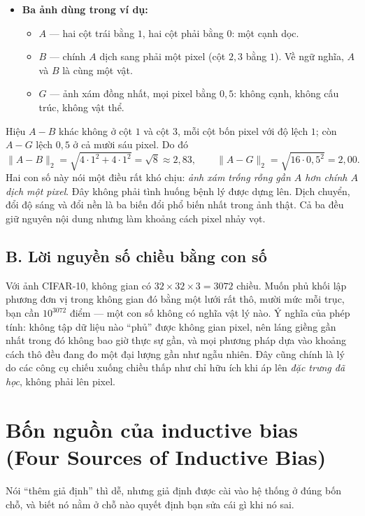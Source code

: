 \documentclass[../../deep_learning.tex]{subfiles}
\begin{document}
\begin{itemize}
\item \textbf{Ba ảnh dùng trong ví dụ:}
  \begin{itemize}
  \item \(A\) --- hai cột trái bằng \(1\), hai cột phải bằng \(0\): một cạnh dọc.
  \item \(B\) --- chính \(A\) dịch sang phải một pixel (cột \(2,3\) bằng \(1\)). Về ngữ nghĩa, \(A\) và \(B\) là cùng một vật.
  \item \(G\) --- ảnh xám đồng nhất, mọi pixel bằng \(0{,}5\): không cạnh, không cấu trúc, không vật thể.
  \end{itemize}
\end{itemize}

Hiệu \(A-B\) khác không ở cột \(1\) và cột \(3\), mỗi cột bốn pixel với độ lệch \(1\); còn \(A-G\) lệch \(0{,}5\) ở cả mười sáu pixel. Do đó
\[
\|A-B\|_2 = \sqrt{4\cdot 1^2 + 4\cdot 1^2} = \sqrt{8} \approx 2{,}83,
\qquad
\|A-G\|_2 = \sqrt{16\cdot 0{,}5^2} = 2{,}00 .
\]
Hai con số này nói một điều rất khó chịu: \emph{ảnh xám trống rỗng gần \(A\) hơn chính \(A\) dịch một pixel}. Đây không phải tình huống bệnh lý được dựng lên. Dịch chuyển, đổi độ sáng và đổi nền là ba biến đổi phổ biến nhất trong ảnh thật. Cả ba đều giữ nguyên nội dung nhưng làm khoảng cách pixel nhảy vọt.

\subsection{B. Lời nguyền số chiều bằng con số}
Với ảnh CIFAR-10, không gian có \(32\times32\times3 = 3072\) chiều. Muốn phủ khối lập phương đơn vị trong không gian đó bằng một lưới rất thô, mười mức mỗi trục, bạn cần \(10^{3072}\) điểm --- một con số không có nghĩa vật lý nào. Ý nghĩa của phép tính: không tập dữ liệu nào ``phủ'' được không gian pixel, nên láng giềng gần nhất trong đó không bao giờ thực sự gần, và mọi phương pháp dựa vào khoảng cách thô đều đang đo một đại lượng gần như ngẫu nhiên. Đây cũng chính là lý do các công cụ chiếu xuống chiều thấp như  \cite{mcinnes2018umap} chỉ hữu ích khi áp lên \emph{đặc trưng đã học}, không phải lên pixel.

\section{Bốn nguồn của inductive bias (Four Sources of Inductive Bias)}
Nói ``thêm giả định'' thì dễ, nhưng giả định được cài vào hệ thống ở đúng bốn chỗ, và biết nó nằm ở chỗ nào quyết định bạn sửa cái gì khi nó sai.
\end{document}
